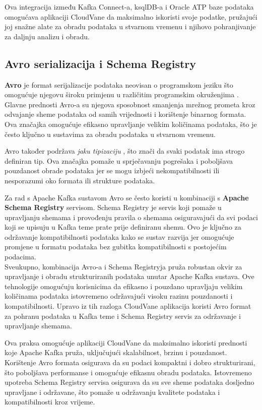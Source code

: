 \documentclass[times, utf8, diplomski]{fer}
\begin{document}
Ova integracija između Kafka Connect-a, ksqlDB-a i Oracle ATP baze podataka omogućava aplikaciji CloudVane da maksimalno iskoristi svoje podatke, pružajući joj snažne alate za obradu podataka u stvarnom vremenu i njihovo pohranjivanje za daljnju analizu i obradu.

\clearpage
\subsection{Avro serializacija i Schema Registry}
\label{sec:schema}

\textbf{Avro} je format serijalizacije podataka neovisan o programskom jeziku što omogućuje njegovu široku primjenu u različitim programskim okruženjima \citep{shapira_kafka_2021}. Glavne prednosti Avro-a su njegova sposobnost smanjenja mrežnog prometa kroz odvajanje sheme podataka od samih vrijednosti i korištenje binarnog formata. Ova značajka omogućuje efikasno upravljanje velikim količinama podataka, što je često ključno u sustavima za obradu podataka u stvarnom vremenu.

Avro također podržava \emph{jaku tipizaciju} , što znači da svaki podatak ima strogo definiran tip. Ova značajka pomaže u sprječavanju pogrešaka i poboljšava pouzdanost obrade podataka jer se mogu izbjeći nekompatibilnosti ili nesporazumi oko formata ili strukture podataka.

Za rad s Apache Kafka sustavom Avro se često koristi u kombinaciji s \textbf{Apache Schema Registry} servisom. Schema Registry je servis koji pomaže u upravljanju shemama i provođenju pravila o shemama osiguravajući da svi podaci koji se upisuju u Kafka teme prate prije definiranu shemu. Ovo je ključno za održavanje kompatibilnosti podataka kako se sustav razvija jer omogućuje promjene u formatu podataka bez gubitka kompatibilnosti s postojećim podacima. \\

Sveukupno, kombinacija Avro-a i Schema Registryja pruža robustan okvir za upravljanje i obradu strukturiranih podataka unutar Apache Kafka sustava. Ove tehnologije omogućuju korisnicima da efikasno i pouzdano upravljaju velikim količinama podataka istovremeno održavajući visoku razinu pouzdanosti i kompatibilnosti. Upravo iz tih razloga CloudVane aplikacija koristi Avro format za pohranu podataka u Kafka teme i Schema Registry servis za održavanje i upravljanje shemama.

Ova praksa omogućuje aplikaciji CloudVane da maksimalno iskoristi prednosti koje Apache Kafka pruža, uključujući skalabilnost, brzinu i pouzdanost. Korištenje Avro formata osigurava da su podaci kompaktni i dobro strukturirani, što poboljšava performanse i omogućuje efikasnu obradu podataka. Istovremeno upotreba Schema Registry servisa osigurava da su sve sheme podataka dosljedno upravljane i održavane, što pomaže u održavanju kvalitete podataka i kompatibilnosti kroz vrijeme.
\end{document}
